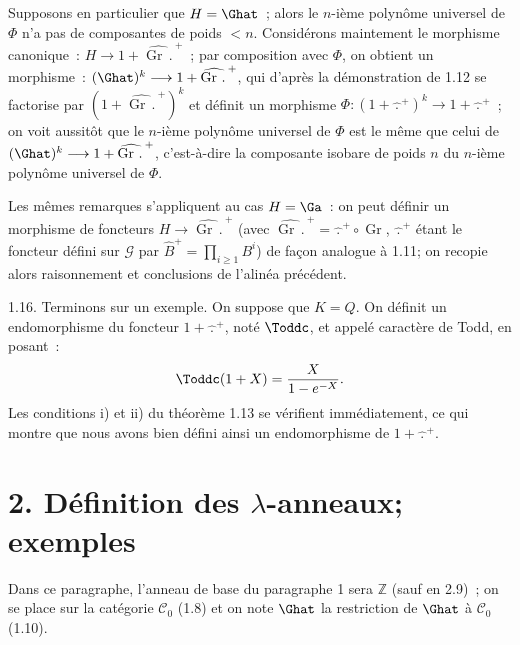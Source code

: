 
Supposons en particulier que \(H=\Ghat\)~; alors le \(n\)-ième polynôme universel de \(\Phi\) n'a pas de composantes de poids \(<n\). Considérons maintement le morphisme canonique~: \(H\longrightarrow1+\widehat{\operatorname{Gr}\,\mathord{.}\,}^{+}\)~; par composition avec \(\Phi\), on obtient un morphisme~: \((\Ghat)^k\longrightarrow1+\widehat{\operatorname{Gr}\,\mathord{.}\,}^{+}\), qui d'après la démonstration de 1.12 se factorise par \((1+\widehat{\operatorname{Gr}\,\mathord{.}\,}^{+})^k\) et définit un morphisme \(\Phi:(1+\widehat{\,\mathord{.}\,}^{+})^k\longrightarrow1+\widehat{\,\mathord{.}\,}^{+}\)~; on voit aussitôt que le \(n\)-ième polynôme universel de \(\Phi\) est le même que celui de \((\Ghat)^k\longrightarrow1+\widehat{\operatorname{Gr}\,\mathord{.}\,}^{+}\), c'est-à-dire la composante isobare de poids \(n\) du \(n\)-ième polynôme universel de \(\Phi\).

Les mêmes remarques s'appliquent au cas \(H=\Ga\)~: on peut définir un morphisme de foncteurs \(H\longrightarrow\widehat{\operatorname{Gr}\,\mathord{.}\,}^{+}\) (avec \(\widehat{\operatorname{Gr}\,\mathord{.}\,}^{+}=\widehat{\,\mathord{.}\,}^{+}\circ\operatorname{Gr}\), \(\widehat{\,\mathord{.}\,}^{+}\) étant le foncteur défini sur \(\mathcal G\) par \(\widehat B^+=\prod_{i\geq1}B^i\)) de façon analogue à 1.11; on recopie alors raisonnement et conclusions de l'alinéa précédent.

1.16. Terminons sur un exemple. On suppose que \(K=Q\). On définit un endomorphisme du foncteur \(1+\widehat{\,\mathord{.}\,}^{+}\), noté \(\Toddc\), et appelé caractère de Todd, en posant~:
\[
  \Toddc(1+X)=\frac{X}{1-e^{-X}}.
\]
Les conditions i) et ii) du théorème 1.13 se vérifient immédiatement, ce qui montre que nous avons bien défini ainsi un endomorphisme de \(1+\widehat{\,\mathord{.}\,}^{+}\).

\section*{2. Définition des \(\lambda\)-anneaux; exemples}

Dans ce paragraphe, l'anneau de base du paragraphe 1 sera \(\mathbb Z\) (sauf en 2.9)~; on se place sur la catégorie \(\mathcal C_0\) (1.8) et on note \(\Ghat\) la restriction de \(\Ghat\) à \(\mathcal C_0\) (1.10).

